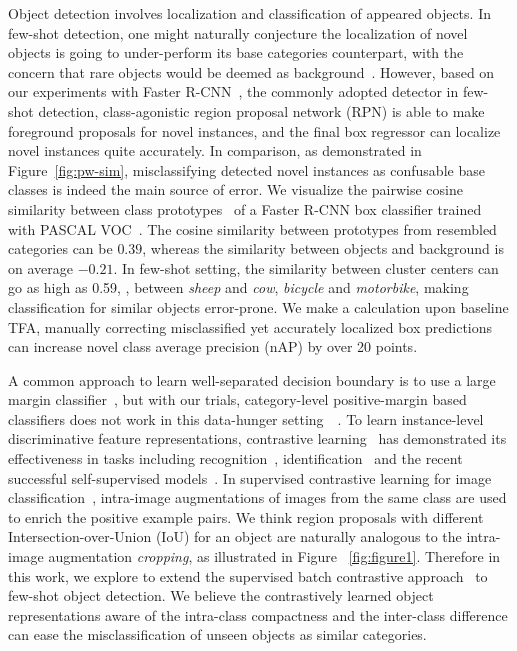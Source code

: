 \documentclass[final]{cvpr}
\begin{document}
Object detection involves localization and classification of appeared objects. In few-shot detection, one might naturally conjecture the localization of novel objects is going to under-perform its base categories counterpart, with the concern that rare objects would be deemed as background~\cite{wang_meta-learning_2019,yan_meta_2020,fan2020few}. However, based on our experiments with Faster R-CNN~\cite{ren_faster_2016}, the commonly adopted detector in few-shot detection, class-agonistic region proposal network (RPN) is able to make foreground proposals for novel instances, and the final box regressor can localize novel instances quite accurately. In comparison, as demonstrated in Figure~\ref{fig:pw-sim}, misclassifying detected novel instances as confusable base classes is indeed the main source of error. We visualize the pairwise cosine similarity between class prototypes~\cite{snell_prototypical_2017,cos_face,deng_arcface_2019} of a Faster R-CNN box classifier trained with PASCAL VOC~\cite{voc07,voc12}. The cosine similarity between prototypes from resembled categories can be $0.39$, whereas the similarity between objects and background is on average $-0.21$. In few-shot setting, the similarity between cluster centers can go as high as 0.59, \eg, between \textit{sheep} and \textit{cow}, \textit{bicycle} and \textit{motorbike}, making classification for similar objects error-prone.  We make a calculation upon baseline TFA, manually correcting misclassified yet accurately localized box predictions can increase novel class average precision (nAP) by over 20 points.

A common approach to learn well-separated decision boundary is to use a large margin classifier~\cite{large_margin}, but with our trials, category-level positive-margin based classifiers does not work in this data-hunger setting~~\cite{cos_face,deng2009imagenet}. To learn instance-level discriminative feature representations, contrastive learning~\cite{hadsell2006dimensionality,1467314} has demonstrated its effectiveness in tasks including recognition~\cite{schroff2015facenet}, identification~\cite{sun2014deep} and the recent successful self-supervised models~\cite{wu_unsupervised_2018,xie2020delving,he_momentum_2020,chen_simple_2020}. In supervised contrastive learning for image classification~\cite{supervised_contrastive_learning}, intra-image augmentations of images from the same class are used to enrich the positive example pairs. We think region proposals with different Intersection-over-Union (IoU) for an object are naturally analogous to the intra-image augmentation \textit{cropping}, as illustrated in Figure ~\ref{fig:figure1}. Therefore in this work, we explore to extend the supervised batch contrastive approach~\cite{supervised_contrastive_learning} to few-shot object detection. We believe the contrastively learned object representations aware of the intra-class compactness and the inter-class difference can ease the misclassification of unseen objects as similar categories.
\end{document}
